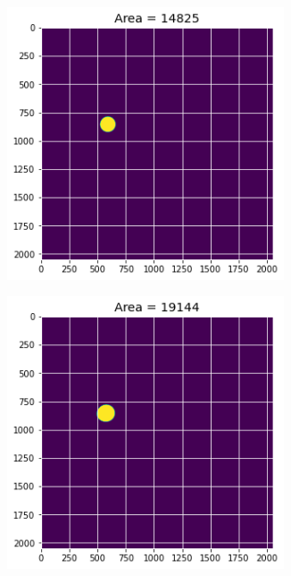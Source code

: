 \documentclass[12pt, a4paper]{report}
\begin{document}
\begin{figure}[H]
\centering
\begin{subfigure}{.24\textwidth}
  \centering
  \includegraphics[width=0.9\textwidth]{Pictures/Growth/1.1.jpeg}
  \label{img:microstrImg}
\end{subfigure}
\begin{subfigure}{.24\textwidth}
  \centering
  \includegraphics[width=0.9\textwidth]{Pictures/Growth/1.2.jpeg}

\end{subfigure}
\end{figure}
\end{document}
